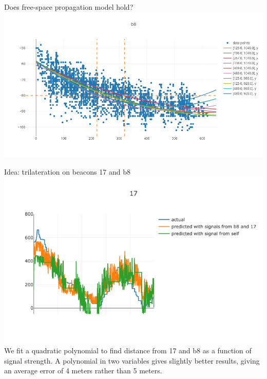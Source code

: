 \documentclass[landscape]{infslides}
\begin{document}
\begin{slide}{Does free-space propagation model hold?}
    \thispagestyle{nofooter}
\includegraphics[scale=0.6]{images/different_directions.png}
\end{slide}

\begin{slide}{Idea: trilateration on beacons 17 and b8}
\includegraphics[width=\linewidth]{images/dist_f_rssi_17.png}
We fit a quadratic polynomial to find distance from 17 and b8 as a function of signal strength. A polynomial in two variables gives slightly better results, giving an average error of 4 meters rather than 5 meters.
\end{slide}
\end{document}
